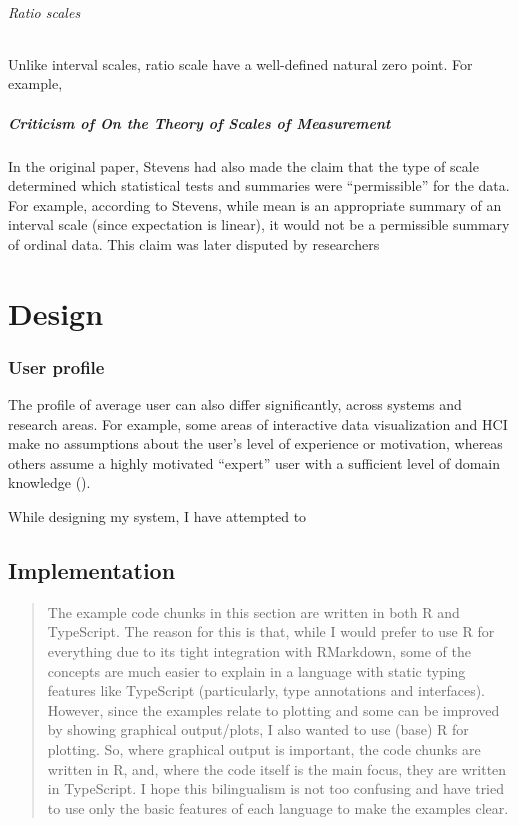 \documentclass[
]{book}
\theoremstyle{definition}
\theoremstyle{definition}
\theoremstyle{definition}
\theoremstyle{definition}
\theoremstyle{remark}
\begin{document}
\subparagraph{Ratio scales}\label{ratio-scales}

Unlike interval scales, ratio scale have a well-defined natural zero point. For example,

\paragraph{Criticism of On the Theory of Scales of Measurement}\label{criticism-of-on-the-theory-of-scales-of-measurement}

In the original paper, Stevens had also made the claim that the type of scale determined which statistical tests and summaries were ``permissible'' for the data. For example, according to Stevens, while mean is an appropriate summary of an interval scale (since expectation is linear), it would not be a permissible summary of ordinal data. This claim was later disputed by researchers

\chapter{Design}\label{design}

\subsection{User profile}\label{user-profile}

The profile of average user can also differ significantly, across systems and research areas. For example, some areas of interactive data visualization and HCI make no assumptions about the user's level of experience or motivation, whereas others assume a highly motivated ``expert'' user with a sufficient level of domain knowledge ().

While designing my system, I have attempted to

\section{Implementation}\label{implementation}

\begin{quote}
The example code chunks in this section are written in both R and TypeScript. The reason for this is that, while I would prefer to use R for everything due to its tight integration with RMarkdown, some of the concepts are much easier to explain in a language with static typing features like TypeScript (particularly, type annotations and interfaces). However, since the examples relate to plotting and some can be improved by showing graphical output/plots, I also wanted to use (base) R for plotting. So, where graphical output is important, the code chunks are written in R, and, where the code itself is the main focus, they are written in TypeScript. I hope this bilingualism is not too confusing and have tried to use only the basic features of each language to make the examples clear.
\end{quote}
\end{document}
